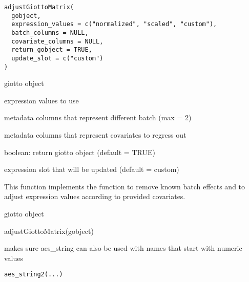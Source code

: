 \documentclass[a4paper]{book}
\begin{document}
%
\begin{Usage}
\begin{verbatim}
adjustGiottoMatrix(
  gobject,
  expression_values = c("normalized", "scaled", "custom"),
  batch_columns = NULL,
  covariate_columns = NULL,
  return_gobject = TRUE,
  update_slot = c("custom")
)
\end{verbatim}
\end{Usage}
%
\begin{Arguments}
\begin{ldescription}
\item[\code{gobject}] giotto object

\item[\code{expression\_values}] expression values to use

\item[\code{batch\_columns}] metadata columns that represent different batch (max = 2)

\item[\code{covariate\_columns}] metadata columns that represent covariates to regress out

\item[\code{return\_gobject}] boolean: return giotto object (default = TRUE)

\item[\code{update\_slot}] expression slot that will be updated (default = custom)
\end{ldescription}
\end{Arguments}
%
\begin{Details}\relax
This function implements the  function to
remove known batch effects and to adjust expression values according to provided covariates.
\end{Details}
%
\begin{Value}
giotto object
\end{Value}
%
\begin{Examples}
\begin{ExampleCode}
    adjustGiottoMatrix(gobject)
\end{ExampleCode}
\end{Examples}
%
\begin{Description}\relax
makes sure aes\_string can also be used with names that start with numeric values
\end{Description}
%
\begin{Usage}
\begin{verbatim}
aes_string2(...)
\end{verbatim}
\end{Usage}
\end{document}
